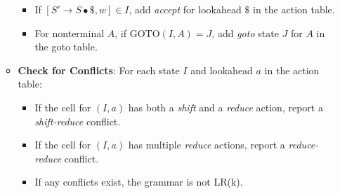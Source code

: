\begin{enumerate}
\begin{itemize}
\begin{itemize}
        \item If $[S' \to S \bullet \$, w] \in I$, add \textit{accept} for lookahead $\$$ in the action table.
        \item For nonterminal $A$, if $\text{GOTO}(I, A) = J$, add \textit{goto} state $J$ for $A$ in the goto table.
        \end{itemize}
      \item \textbf{Check for Conflicts}: For each state $I$ and lookahead $a$ in the action table:
        \begin{itemize}
        \item If the cell for $(I, a)$ has both a \textit{shift} and a \textit{reduce} action, report a \textit{shift-reduce} conflict.
        \item If the cell for $(I, a)$ has multiple \textit{reduce} actions, report a \textit{reduce-reduce} conflict.
        \item If any conflicts exist, the grammar is not LR(k).
        \end{itemize}
      \end{itemize}
      \end{enumerate}
